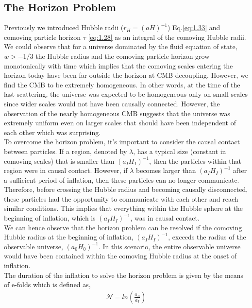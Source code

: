 \subsection{The Horizon Problem}
\hspace{0.5cm}Previously we introduced Hubble radii ($r_H = (aH)^{-1}$) Eq.\eqref{eq:1.33} and comoving particle horizon $\tau$ \eqref{eq:1.28} as an integral of the comoving Hubble radii. We could observe that for a universe dominated by the fluid equation of state, $w > -1/3 $ the Hubble radius and the comoving particle horizon grow monotonically with time which implies that the comoving scales entering the horizon today have been far outside the horizon at CMB decoupling. However, we find the CMB to be extremely homogeneous. In other words, at the time of the last scattering, the universe was expected to be homogeneous only on small scales since wider scales would not have been causally connected. However, the observation of the nearly homogeneous CMB suggests that the universe was extremely uniform even on larger scales that should have been independent of each other which was surprising.\\
\hspace{0.5cm}To overcome the horizon problem, it's important to consider the causal contact between particles. If a region, denoted by $\lambda$, has a typical size (constant in comoving scales) that is smaller than $(a_{I}H_{I})^{-1}$, then the particles within that region were in causal contact. However, if $\lambda$ becomes larger than $(a_{I}H_{I})^{-1}$ after a sufficient period of inflation, then these particles can no longer communicate. Therefore, before crossing the Hubble radius and becoming causally disconnected, these particles had the opportunity to communicate with each other and reach similar conditions. This implies that everything within the Hubble sphere at the beginning of inflation, which is $(a_{I}H_{I})^{-1}$, was in causal contact.\\
\hspace{0.5cm} We can hence observe that the horizon problem can be resolved if the comoving Hubble radius at the beginning of inflation, $(a_I H_I)^{-1}$, exceeds the radius of the observable universe, $(a_0 H_0)^{-1}$. In this scenario, the entire observable universe would have been contained within the comoving Hubble radius at the onset of inflation.\\
The duration of the inflation to solve the horizon problem is given by the means of e-folds which is defined as,
\begin{align}
    \mathcal{N} = ln \left( \frac{a_E}{a_I} \right)
\end{align} \label{1.2.1}
